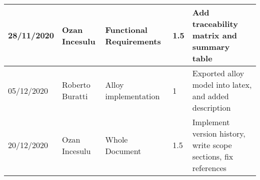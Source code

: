 \begin{table}[H]
\begin{tabular}{|p{2cm}|p{2.5cm}|p{2cm}|p{1.5cm}|p{8cm}|}
        28/11/2020 & Ozan Incesulu   & Functional Requirements & 1.5           & Add traceability matrix and summary table\\ \hline
        05/12/2020 & Roberto Buratti & Alloy implementation & 1                & Exported alloy model into latex, and added description \\ \hline
        20/12/2020 & Ozan Incesulu   & Whole Document       & 1.5              & Implement version history, write scope sections, fix references \\ \hline

    \end{tabular}
\end{table}
